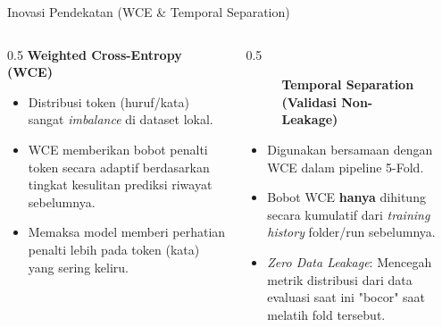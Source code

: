 \begin{frame}{Inovasi Pendekatan (WCE \& Temporal Separation)}
    \begin{columns}
        \begin{column}{0.5\textwidth}
            \textbf{Weighted Cross-Entropy (WCE)}
            \begin{itemize}
                \item Distribusi token (huruf/kata) sangat \textit{imbalance} di dataset lokal.
                \item WCE memberikan bobot penalti token secara adaptif berdasarkan tingkat kesulitan prediksi riwayat sebelumnya.
                \item Memaksa model memberi perhatian penalti lebih pada token (kata) yang sering keliru.
            \end{itemize}
        \end{column}
        \begin{column}{0.5\textwidth}
            \begin{figure}[!ht]
                \centering
                \textbf{Temporal Separation (Validasi Non-Leakage)}
            \end{figure}
            \begin{itemize}
                \item Digunakan bersamaan dengan WCE dalam pipeline 5-Fold.
                \item Bobot WCE \textbf{hanya} dihitung secara kumulatif dari \textit{training history} folder/run sebelumnya.
                \item \textit{Zero Data Leakage}: Mencegah metrik distribusi dari data evaluasi saat ini "bocor" saat melatih fold tersebut.
            \end{itemize}
        \end{column}
    \end{columns}
\end{frame}

